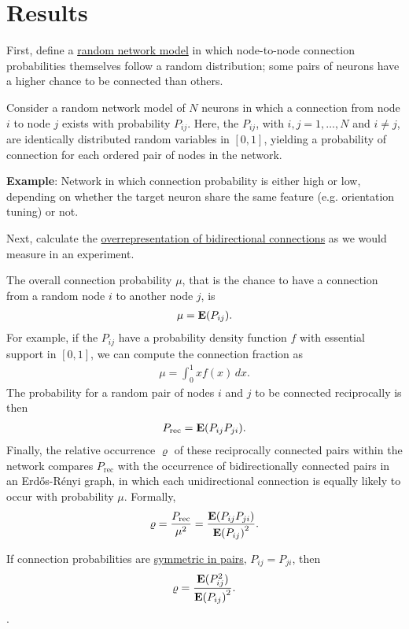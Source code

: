 
\section*{Results}

First, define a \underline{random network model} in which node-to-node connection probabilities themselves follow a random distribution; some pairs of neurons have a higher chance to be connected than others.


Consider a random network model of $N$ neurons in which a connection from node $i$ to node $j$ exists with probability $P_{ij}$.
%
Here, the $P_{ij}$, with $i,j = 1,\dots,N$ and $i \neq j$, are identically distributed random variables in $[0,1]$, yielding a probability of connection for each ordered pair of nodes in the network.

\textbf{\textcolor{gblue}{Example}}: Network in which connection probability is either high or low, depending on whether the target neuron share the same feature (e.g. orientation tuning) or not.

Next, calculate the \underline{overrepresentation of bidirectional connections} as we would measure in an experiment.

The overall connection probability $\mu$, that is the chance to have a connection from a random node $i$ to another node $j$, is
\begin{align}
\mu = \operatorname{\mathbf{E}}(P_{ij}).
\end{align}
For example, if the $P_{ij}$ have a probability density function $f$ with essential support in $[0,1]$, we can compute the connection fraction as
\begin{align}
  \mu = \int_0^1 x f(x)\,dx.
\end{align}
The probability for a random pair of nodes $i$ and $j$ to be connected reciprocally is then
\begin{align}
P_{\mathrm{rec}} = \operatorname{\mathbf{E}}(P_{ij} P_{ji}).
\end{align}
Finally, the relative occurrence $\varrho$ of these reciprocally connected pairs within the network compares $P_{\mathrm{rec}}$ with the occurrence of bidirectionally connected pairs in an Erd\H{o}s-R\'{e}nyi graph, in which each unidirectional connection is equally likely to occur with probability $\mu$. Formally,
\begin{align}
  \varrho = \frac{P_{\mathrm{rec}}}{\mu^2} = \frac{\E\left(P_{ij}P_{ji}\right)}{{\E\left(P_{ij}\right)}^2}.
\end{align}

If connection probabilities are \underline{symmetric in pairs}, $P_{ij} = P_{ji}$, then
\begin{align}
\varrho = \frac{\E(P_{ij}^2)}{{\E\left(P_{ij}\right)}^2}.
\end{align}.

